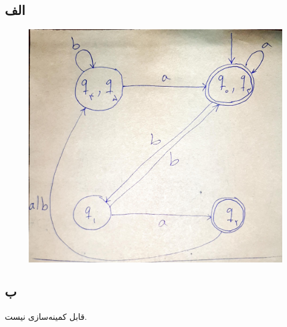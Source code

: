 \documentclass{article}
\begin{document}
\section{}%
\subsection{الف}
\begin{figure}[H]
    \centering
    \includegraphics[width=1\textwidth]{figures/5a.jpg}
    \caption
	{}
    \label{fig:fig1}
\end{figure}
\subsection{ب}
قابل کمینه‌سازی نیست.

\section{}%
\end{document}
